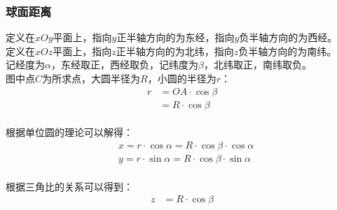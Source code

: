 \documentclass[UTF8]{ctexart}
\begin{document}
\subsubsection{球面距离}
    定义在$xOy$平面上，指向$y$正半轴方向的为东经，指向$y$负半轴方向的为西经。\\[3mm]
    定义在$xOz$平面上，指向$z$正半轴方向的为北纬，指向$z$负半轴方向的为南纬。\\[3mm]
    记经度为$\alpha$，东经取正，西经取负，记纬度为$\beta$，北纬取正，南纬取负。\\[5mm]
    图中点$C$为所求点，大圆半径为$R$，小圆的半径为$r$：
    \setcounter{equation}{0}
    \begin{align}
        r
        &=OA\cdot\cos{\beta}\\[2mm]
        &=R\cdot\cos{\beta}
    \end{align}\\
    根据单位圆的理论可以解得：
    \begin{align}
        &x
        =r\cdot \cos{\alpha}
        =R\cdot\cos{\beta}\cdot\cos{\alpha}\\[2mm]
        &y
        =r\cdot \sin{\alpha}
        =R\cdot\cos{\beta}\cdot\sin{\alpha}
    \end{align}\\
    根据三角比的关系可以得到：
    \begin{align}
        z
        &=R\cdot\cos{\beta}
    \end{align}
\end{document}
